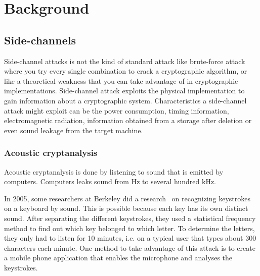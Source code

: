 \chapter{Background}
\label{chp:background} 


\section{Side-channels}\label{chp2:sec:side_channel}
Side-channel attacks is not the kind of standard attack like brute-force attack where you try every single combination to crack a cryptographic algorithm, or like a theoretical weakness that you can take advantage of in cryptographic implementations. 
Side-channel attack exploits the physical implementation to gain information about a cryptographic system.
Characteristics a side-channel attack might exploit can be the power consumption, timing information, electromagnetic radiation, information obtained from a storage after deletion or even sound leakage from the target machine.



\subsection{Acoustic cryptanalysis}\label{chp2:subsec:acoustic_cryptanalysis}

Acoustic cryptanalysis is done by listening to sound that is emitted by computers. 
Computers leaks sound from Hz to several hundred kHz. 

In 2005, some researchers at Berkeley did a research~\cite{url:keystrokes} on recognizing keystrokes on a keyboard by sound. 
This is possible because each key has its own distinct sound. 
After separating the different keystrokes, they used a statistical frequency method to find out which key belonged to which letter. 
To determine the letters, they only had to listen for 10 minutes, i.e. on a typical user that types about 300 characters each minute. 
One method to take advantage of this attack is to create a mobile phone application that enables the microphone and analyses the keystrokes. 

